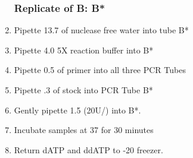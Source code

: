 \documentclass{ssiBio}
\begin{document}
\begin{enumerate}
\subsubsection{Replicate of B: B*}
\item{Pipette 13.7\uL{} of nuclease free water into tube B*\label{B1}}
\item{Pipette 4.0\uL{} 5X \tdt{} reaction buffer into B*\label{B2}}
\item{Pipette 0.5\uL{} of primer into all three PCR Tubes\label{B3}}
\item{Pipette .3\uL{} of \BdATP{} stock into PCR Tube B*\label{B4}}
\item{Gently pipette 1.5\uL{} \tdt (20U/\uL{}) into B*.\label{B5}}
\vspace{3mm}
\item{Incubate samples at 37\C{} for 30 minutes}\\
\item{Return dATP and ddATP to -20\C{} freezer.}
\stopPoint{} 

\end{enumerate}
\end{document}

